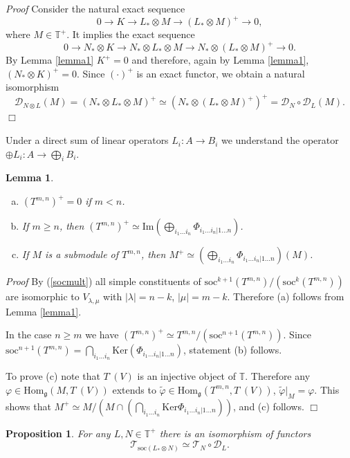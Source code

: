 \documentclass[11pt]{amsart}
\newcounter{theorem}
\newtheorem{prop}{Proposition}
\newtheorem{lemma}[theo]{Lemma}
\renewenvironment{proof}{ \emph{Proof}}{$\Box$}
\newcommand{\TT}{\mathbb{T}}
\renewcommand{\gg}{\mathfrak{g}}
\renewcommand {\phi} {\varphi}
\newcommand{\refle}[1]{Lemma \ref{#1}}
\renewcommand{\Im}{\mathrm{Im}}
\newcommand{\soc}{\mathrm{soc}}
\newcommand{\Ker}{\mathrm{Ker}}
\newcommand{\Hom}{\mathrm{Hom}}
\begin{document}
\begin{proof}
Consider the natural exact sequence
$$0\rightarrow K\rightarrow L_*\otimes M\rightarrow(L_*\otimes M)^+\rightarrow 0,$$
where $M\in\mathbb T^+$.
It implies the exact sequence
$$0\rightarrow N_*\otimes K\rightarrow N_*\otimes L_*\otimes M\rightarrow N_*\otimes(L_*\otimes M)^+\rightarrow 0.$$
By \refle{lemma1} $K^+=0$ and therefore, again by \refle{lemma1}, $(N_*\otimes K)^+=0$.
Since $(\cdot)^+$ is an exact functor, we obtain a natural isomorphism
$$ \mathcal D_{N\otimes L}(M)=(N_*\otimes L_*\otimes M)^+\simeq(N_*\otimes(L_*\otimes M)^+)^+=\mathcal D_N\circ \mathcal D_L(M).$$
\end{proof}



Under a direct sum of linear operators $L_i: A\rightarrow B_i$ we understand the operator
$\oplus L_i:A\rightarrow\bigoplus_i B_i.$

\begin{lemma}\label{lemma4}
\begin{enumerate}[(a)]
 \item $(T^{m,n})^+=0$ if $m<n$.
 \item If $m\geq n$, then $(T^{m,n})^+\simeq\Im\left(\bigoplus_{i_1...i_n}\Phi_{i_1...i_n|1...n}\right)$.
 \item If $M$ is a submodule of $T^{m,n}$, then $M^+\simeq\left(\bigoplus_{i_1...i_n}\Phi_{i_1...i_n|1...n}\right)(M)$.
\end{enumerate}
\end{lemma}

\begin{proof}
By (\ref{socmult}) all simple constituents of $\soc^{k+1}(T^{m,n})/(\soc^{k}(T^{m,n}))$ are isomorphic to
$V_{\lambda,\mu}$ with $|\lambda|=n-k$, $|\mu|=m-k$. Therefore (a) follows from
\refle{lemma1}. 

In the case $n\geq m$ we have $(T^{m,n})^+\simeq T^{m,n}/(\soc^{n+1}(T^{m,n}))$.
Since $\soc^{n+1}(T^{m,n})=\bigcap_{i_1...i_n}\Ker(\Phi_{i_1...i_n|1...n})$, statement (b) follows. 

To prove (c) note that $T^\cdot(V)$ is an injective object of $\mathbb T$. Therefore 
any $\phi\in\Hom_\gg(M,T^\cdot(V))$ extends to $\tilde{\phi}\in\Hom_\gg(T^{m,n},T^\cdot(V))$,
$\tilde{\phi}|_M=\phi$. This shows that $\displaystyle M^+\simeq M/(M\cap(\bigcap_{i_1\dots i_n}\Ker\Phi_{i_1...i_n|1...n}))$,
and (c) follows.
\end{proof}



\begin{prop}\label{prop1} For any $L,N\in\TT^+$ there is an isomorphism of functors
$$\mathcal T_{\soc(L_*\otimes N)}\simeq  \mathcal T_N\circ\mathcal D_L.$$
\end{prop}
\end{document}
